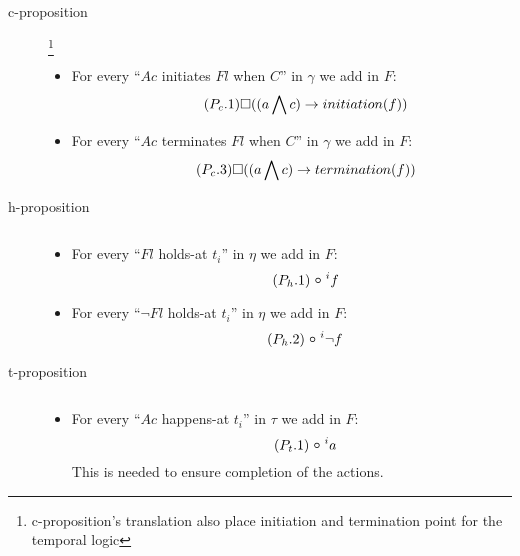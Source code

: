 \begin{description}
  \item[c-proposition]\footnote{c-proposition's translation also place initiation and termination point for the temporal logic}
  \begin{itemize}
    \item For every “$Ac$ initiates $Fl$ when $C$” in $\gamma$ we add in $F$:
    \begin{equation}\tag{$P_c.1$}
      \square((a\bigwedge c)\rightarrow initiation(f))
    \end{equation}
    \item For every “$Ac$ terminates $Fl$ when $C$” in $\gamma$ we add in $F$:
    \begin{equation}\tag{$P_c.3$}
      \square((a\bigwedge c)\rightarrow termination(f))
    \end{equation}
  \end{itemize}
  \item[h-proposition] $ $
  \begin{itemize}
    \item For every “$Fl$ holds-at $t_i$” in $\eta$ we add in $F$:
    \begin{equation}\tag{$P_h.1$}
      \next^{i}f
    \end{equation}
    \item For every “$\neg Fl$ holds-at $t_i$” in $\eta$ we add in $F$:
    \begin{equation}\tag{$P_h.2$}
      \next^{i} \neg f
    \end{equation}
  \end{itemize}
  \item[t-proposition] $ $
  \begin{itemize}
    \item For every “$Ac$ happens-at $t_i$” in $\tau$ we add in $F$:
    \begin{equation}\tag{$P_t.1$}
      \next^{i}a
    \end{equation}
      This is needed to ensure completion of the actions.

  \end{itemize}
\end{description}

